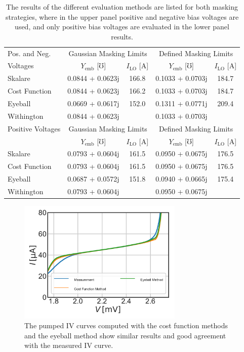 \documentclass[]{article}
\begin{document}
\begin{table}[]
	\centering
	\renewcommand{\arraystretch}{1.5}
	\begin{tabular}{l|cc|cc}
		\hline
		Pos. and Neg. & \multicolumn{2}{c|}{Gaussian Masking Limits} & \multicolumn{2}{c}{Defined Masking Limits} \\
		Voltages& $Y_\text{emb}$ [$\mho$] & $I_\text{LO}$ [\textmu A] & $Y_\text{emb}$ [$\mho$] & $I_\text{LO}$ [\textmu A] \\\hline
		Skalare & 0.0844 + 0.0623j & 166.8 & 0.1033 + 0.0703j & 184.7 \\
		Cost Function & 0.0844 + 0.0623j & 166.2 & 0.1033 + 0.0703j & 184.7 \\
		Eyeball & 0.0669 + 0.0617j & 152.0 & 0.1311 + 0.0771j & 209.4 \\
		Withington & 0.0844 + 0.0623j &  & 0.1033 + 0.0703j &  \\
		\hline
		Positive Voltages & \multicolumn{2}{c|}{Gaussian Masking Limits} & \multicolumn{2}{c}{Defined Masking Limits} \\
		& $Y_\text{emb}$ [$\mho$] & $I_\text{LO}$ [\textmu A] & $Y_\text{emb}$ [$\mho$] & $I_\text{LO}$ [\textmu A] \\\hline
		Skalare & 0.0793 + 0.0604j & 161.5 & 0.0950 + 0.0675j & 176.5 \\
		Cost Function & 0.0793 + 0.0604j & 161.5 & 0.0950 + 0.0675j & 176.5 \\
		Eyeball & 0.0687 + 0.0572j & 151.8 & 0.0940 + 0.0665j & 175.4 \\
		Withington & 0.0793 + 0.0604j &  & 0.0950 + 0.0675j & 
	\end{tabular}
	\caption{The results of the different evaluation methods are listed for both masking strategies, where in the upper panel positive and negative bias voltages are used, and only positive bias voltages are evaluated in the lower panel results.}
	\label{tab:Yemb}
\end{table}
\begin{figure}
\centering
\includegraphics[width=0.7\textwidth]{../Mixer_Unit_Test/2020_01_14_Fixed_Mask/Pumped_Recovered_Comparison.pdf}
\caption{The pumped IV curves computed with the cost function methods and the eyeball method show similar results and good agreement with the measured IV curve.}
\label{fig:Pumped_Recovered_Compaison}
\end{figure}
\end{document}
